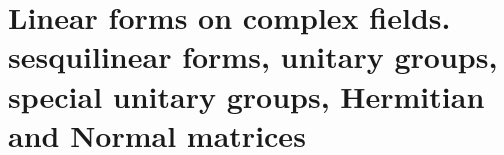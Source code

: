 
\chapter{Linear forms on complex fields. sesquilinear forms, unitary groups, special unitary groups, Hermitian and Normal matrices}

